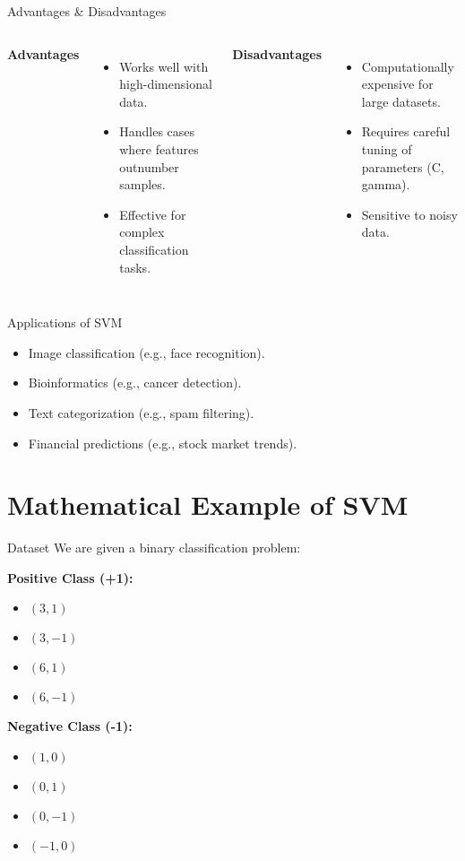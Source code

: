 \documentclass{beamer}
\begin{document}
\begin{frame}{Advantages \& Disadvantages}
    \begin{columns}
        \textbf{Advantages}
        \begin{itemize}
            \item Works well with high-dimensional data.
            \item Handles cases where features outnumber samples.
            \item Effective for complex classification tasks.
        \end{itemize}
        
        \textbf{Disadvantages}
        \begin{itemize}
            \item Computationally expensive for large datasets.
            \item Requires careful tuning of parameters (C, gamma).
            \item Sensitive to noisy data.
        \end{itemize}
    \end{columns}
\end{frame}

\begin{frame}{Applications of SVM}
    \begin{itemize}
        \item Image classification (e.g., face recognition).
        \item Bioinformatics (e.g., cancer detection).
        \item Text categorization (e.g., spam filtering).
        \item Financial predictions (e.g., stock market trends).
    \end{itemize}
\end{frame}


\section{Mathematical Example of SVM}
\begin{frame}{Dataset}
We are given a binary classification problem:

\textbf{Positive Class (+1):}
\begin{itemize}
    \item $(3, 1)$
    \item $(3, -1)$
    \item $(6, 1)$
    \item $(6, -1)$
\end{itemize}

\textbf{Negative Class (-1):}
\begin{itemize}
    \item $(1, 0)$
    \item $(0, 1)$
    \item $(0, -1)$
    \item $(-1, 0)$
\end{itemize}
\end{frame}
\end{document}
